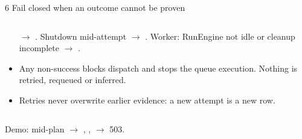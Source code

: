 \begin{frame}{6 \quad Fail closed when an outcome cannot be proven}
\begin{columns}[T]
\begin{column}{0.49\textwidth}
\begin{block}{\vtwo{}}
\begin{itemize}
                          $\rightarrow$ . Shutdown mid-attempt $\rightarrow$ .
                          Worker: RunEngine not idle or cleanup incomplete $\rightarrow$ .
                    \item Any non-success blocks dispatch and stops the queue execution. Nothing is retried,
                          requeued or inferred. 
                    \item Retries never overwrite earlier evidence: a new attempt is a new row.
                \end{itemize}
            \end{block}
        \end{column}
    \end{columns}
    \vspace{0.1cm}
    {\footnotesize\color{qsgray} Demo:  mid-plan $\rightarrow$ 
    , ,  $\rightarrow$ 503.\par}
\end{frame}

